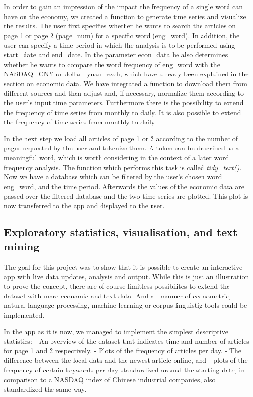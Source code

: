 \documentclass[12pt,a4paper]{article}
\begin{document}
In order to gain an impression of the impact the frequency of a single word can have on the economy, we created a function to generate time series and visualize the results. The user first specifies whether he wants to search the articles on page 1 or page 2 (page\_num) for a specific word (eng\_word). In addition, the user can specify a time period in which the analysis is to be performed using start\_date and end\_date. In the parameter econ\_data he also determines whether he wants to compare the word frequency of eng\_word with the NASDAQ\_CNY or dollar\_yuan\_exch, which have already been explained in the section on economic data. We have integrated a function to download them from different sources and then adjust and, if necessary, normalize them according to the user's input time parameters. Furthermore there is the possibility to extend the frequency of time series from monthly to daily.
It is also possible to extend the frequency of time series from monthly to daily.

In the next step we load all articles of page 1 or 2 according to the number of pages requested by the user and tokenize them. A token can be described as a meaningful word, which is worth considering in the context of a later word frequency analysis. The function which performs this task is called \emph{tidy\_text()}. Now we have a database which can be filtered by the user's chosen word eng\_word, and the time period. Afterwards the values of the economic data are passed over the filtered database and the two time series are plotted. This plot is now transferred to the app and displayed to the user.

\hypertarget{exploratory-statistics-visualisation-and-text-mining-1}{%
\subsection{Exploratory statistics, visualisation, and text mining}\label{exploratory-statistics-visualisation-and-text-mining-1}}

The goal for this project was to show that it is possible to create an interactive app with live data updates, analysis and output. While this is just an illustration to prove the concept, there are of course limitless possibilites to extend the dataset with more economic and text data. And all manner of econometric, natural language processing, machine learning or corpus linguistig tools could be implemented.

In the app as it is now, we managed to implement the simplest descriptive statistics:
- An overview of the dataset that indicates time and number of articles for page 1 and 2 respectively.
- Plots of the frequency of articles per day.
- The difference between the local data and the newest article online, and
- plots of the frequency of certain keywords per day standardized around the starting date, in comparison to a NASDAQ index of Chinese industrial companies, also standardized the same way.
\end{document}
